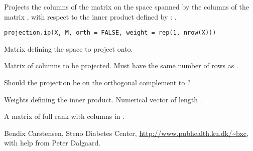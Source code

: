 \begin{Description}\relax
Projects the columns of the matrix  on the space spanned by the
columns of the matrix , with respect to the inner product
defined by : .
\end{Description}
\begin{Usage}
\begin{verbatim}
projection.ip(X, M, orth = FALSE, weight = rep(1, nrow(X)))
\end{verbatim}
\end{Usage}
\begin{Arguments}
\begin{ldescription}
\item[\code{X}] Matrix defining the space to project onto. 
\item[\code{M}] Matrix of columns to be projected. Must have the same number
of rows as . 
\item[\code{orth}] Should the projection be on the orthogonal complement to
? 
\item[\code{weight}] Weights defining the inner product. Numerical vector of
length . 
\end{ldescription}
\end{Arguments}
\begin{Value}
A matrix of full rank with columns in .
\end{Value}
\begin{Author}\relax
Bendix Carstensen, Steno Diabetes Center,
\url{http://www.pubhealth.ku.dk/~bxc}, with help from Peter Dalgaard.
\end{Author}
\begin{SeeAlso}\relax
{}
\end{SeeAlso}

